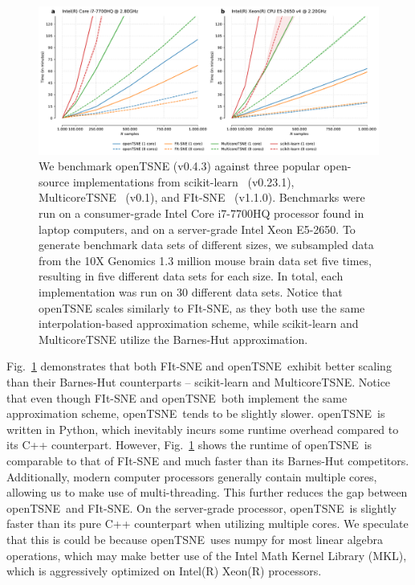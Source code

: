 \documentclass[twocolumn]{bmcart}
\newcommand{\opentsne}{\textsf{openTSNE}}
\begin{document}
\begin{figure}[htbp]
  \includegraphics[width=\textwidth]{benchmarks}
  \caption{\label{fig:benchmarks}We benchmark openTSNE (v0.4.3) against three
	popular open-source implementations from
	scikit-learn~\cite{pedregosa2011scikit} (v0.23.1),
	MulticoreTSNE~\cite{Ulyanov2016} (v0.1), and
	FIt-SNE~\cite{linderman2019fast} (v1.1.0). Benchmarks were run on a
	consumer-grade Intel Core i7-7700HQ processor found in laptop
	computers, and on a server-grade Intel Xeon E5-2650. To generate
	benchmark data sets of different sizes, we subsampled data from the 10X
	Genomics 1.3 million mouse brain data set five times, resulting in five
	different data sets for each size. In total, each implementation was
	run on 30 different data sets. Notice that openTSNE scales similarly to
	FIt-SNE, as they both use the same interpolation-based approximation
	scheme, while scikit-learn and MulticoreTSNE utilize the Barnes-Hut
	approximation.}
\end{figure}

Fig.~\ref{fig:benchmarks} demonstrates that both \textsf{FIt-SNE} and
\opentsne\ exhibit better scaling than their Barnes-Hut
counterparts -- \textsf{scikit-learn} and \textsf{MulticoreTSNE}. Notice that
even though \textsf{FIt-SNE} and \opentsne\ both implement the same
approximation scheme, \opentsne\ tends to be slightly slower. \opentsne\ is
written in Python, which inevitably incurs some runtime overhead compared to
its C++ counterpart. However, Fig.~\ref{fig:benchmarks} shows the
runtime of \opentsne\ is comparable to that of \textsf{FIt-SNE} and much faster
than its Barnes-Hut competitors. Additionally, modern computer processors
generally contain multiple cores, allowing us to make use of multi-threading.
This further reduces the gap between \opentsne\ and \textsf{FIt-SNE}. On the
server-grade processor, \opentsne\ is slightly faster than its pure C++
counterpart when utilizing multiple cores. We speculate that this is could be because \opentsne\ uses
\textsf{numpy} for most linear algebra operations, which may make better use of
the Intel Math Kernel Library (MKL), which is aggressively optimized on
Intel(R) Xeon(R) processors.
\end{document}
